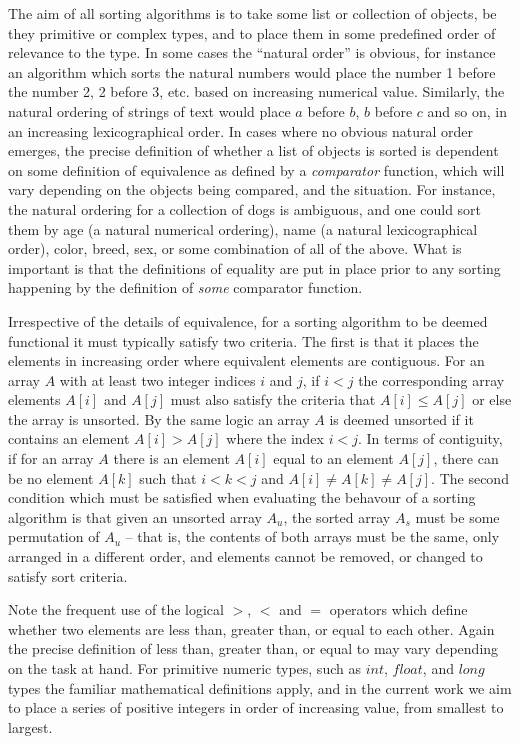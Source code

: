 \documentclass[12pt,a4paper]{article}
\begin{document}
The aim of all sorting algorithms is to take some list or collection of objects, be they primitive or complex types, and to place them in some predefined order of relevance to the type. In some cases the ``natural order'' is obvious, for instance an algorithm which sorts the natural numbers would place the number 1 before the number 2, 2 before 3, etc. based on increasing numerical value. Similarly, the natural ordering of strings of text would place $a$ before $b$, $b$ before $c$ and so on, in an increasing lexicographical order. In cases where no obvious natural order emerges, the precise definition of whether a list of objects is sorted is dependent on some definition of equivalence as defined by a \emph{comparator} function, which will vary depending on the objects being compared, and the situation. For instance, the natural ordering for a collection of dogs is ambiguous, and one could sort them by age (a natural numerical ordering), name (a natural lexicographical order), color, breed, sex, or some combination of all of the above. What is important is that the definitions of equality are put in place prior to any sorting happening by the definition of \emph{some} comparator function.

Irrespective of the details of equivalence, for a sorting algorithm to be deemed functional it must typically satisfy two criteria. The first is that it places the elements in increasing order where equivalent elements are contiguous. For an array $A$ with at least two integer indices $i$ and $j$, if $i < j$ the corresponding array elements $A[i]$ and $A[j]$ must also satisfy the criteria that $A[i] \leq A[j]$ or else the array is unsorted. By the same logic an array $A$ is deemed unsorted if it contains an element $A[i] > A[j]$ where the index $i < j$. In terms of contiguity, if for an array $A$ there is an element $A[i]$ equal to an element $A[j]$, there can be no element $A[k]$ such that $i<k<j$ and $A[i] \neq A[k] \neq A[j]$. The second condition which must be satisfied when evaluating the behavour of a sorting algorithm is that given an unsorted array $A_u$, the sorted array $A_s$ must be some permutation of $A_u$ -- that is, the contents of both arrays must be the same, only arranged in a different order, and elements cannot be removed, or changed to satisfy sort criteria. 

Note the frequent use of the logical $>$, $<$ and $=$ operators which define whether two elements are less than, greater than, or equal to each other. Again the precise definition of less than, greater than, or equal to may vary depending on the task at hand. For primitive numeric types, such as $int$, $float$, and $long$ types the familiar mathematical definitions apply, and in the current work we aim to place a series of positive integers in order of increasing value, from smallest to largest.
\end{document}
